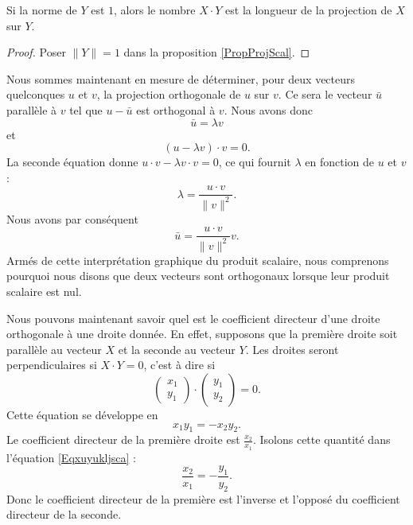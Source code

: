 \begin{corollary}
	Si la norme de $Y$ est $1$, alors le nombre $X\cdot Y$ est la longueur de la projection de $X$ sur $Y$.
\end{corollary}

\begin{proof}
	Poser $\| Y \|=1$ dans la proposition \ref{PropProjScal}.
\end{proof}

Nous sommes maintenant en mesure de déterminer, pour deux vecteurs quelconques $u$ et $v$, la projection orthogonale de $u$ sur $v$. Ce sera le vecteur $\bar u$ parallèle à $v$ tel que $u-\bar u$ est orthogonal à $v$. Nous avons donc
\begin{equation}
    \bar u=\lambda v
\end{equation}
et 
\begin{equation}
    (u-\lambda v)\cdot v=0.
\end{equation}
La seconde équation donne $u\cdot v-\lambda v\cdot v=0$, ce qui fournit $\lambda$ en fonction de $u$ et $v$ :
\begin{equation}
    \lambda=\frac{ u\cdot v }{ \| v \|^2 }.
\end{equation}
Nous avons par conséquent
\begin{equation}
    \bar u=\frac{ u\cdot v }{ \| v \|^2 }v.
\end{equation}
Armés de cette interprétation graphique du produit scalaire, nous comprenons pourquoi nous disons que deux vecteurs sont orthogonaux lorsque leur produit scalaire est nul.

Nous pouvons maintenant savoir quel est le coefficient directeur d'une droite orthogonale à une droite donnée. En effet, supposons que la première droite soit parallèle au vecteur $X$ et la seconde au vecteur $Y$. Les droites seront perpendiculaires si $X\cdot Y=0$, c'est à dire si
\begin{equation}
	\begin{pmatrix}
		x_1	\\ 
		y_1	
	\end{pmatrix}\cdot\begin{pmatrix}
		y_1	\\ 
		y_2	
	\end{pmatrix}=0.
\end{equation}
Cette équation se développe en 
\begin{equation}		\label{Eqxuyukljsca}
	x_1y_1=-x_2y_2.
\end{equation}
Le coefficient directeur de la première droite est $\frac{ x_2 }{ x_1 }$. Isolons cette quantité dans l'équation \eqref{Eqxuyukljsca} :
\begin{equation}
	\frac{ x_2 }{ x_1 }=-\frac{ y_1 }{ y_2 }.
\end{equation}
Donc le coefficient directeur de la première est l'inverse et l'opposé du coefficient directeur de la seconde.

